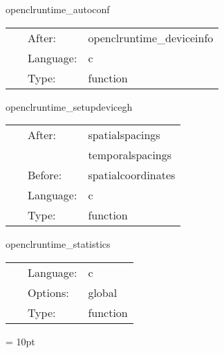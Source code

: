 
\hspace{5mm} openclruntime\_autoconf 

\hspace{5mm}{\it determine whether certain features are supported } 


\hspace{5mm}

 \begin{tabular*}{160mm}{cll} 
~ & After:  & openclruntime\_deviceinfo \\ 
~ & Language:  & c \\ 
~ & Type:  & function \\ 
\end{tabular*} 


\vspace{5mm}


\hspace{5mm} openclruntime\_setupdevicegh 

\hspace{5mm}{\it set up device grid structure } 


\hspace{5mm}

 \begin{tabular*}{160mm}{cll} 
~ & After:  & spatialspacings \\ 
~& ~ &temporalspacings\\ 
~ & Before:  & spatialcoordinates \\ 
~ & Language:  & c \\ 
~ & Type:  & function \\ 
\end{tabular*} 


\vspace{5mm}


\hspace{5mm} openclruntime\_statistics 

\hspace{5mm}{\it output profiling information } 


\hspace{5mm}

 \begin{tabular*}{160mm}{cll} 
~ & Language:  & c \\ 
~ & Options:  & global \\ 
~ & Type:  & function \\ 
\end{tabular*} 



\vspace{5mm}\parskip = 10pt 

